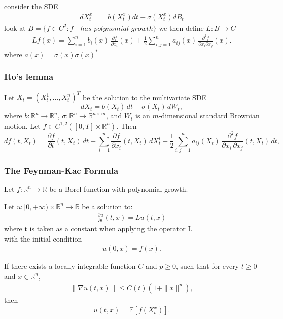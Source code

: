 consider the SDE
\begin{align}
dX_t^x &=b(X_t^x) dt + \sigma(X_t^x)dB_t
\end{align}
look at $B=\{f\in C^2:f\quad has\,\, polynomial\,\, growth\}$ we then define $L:B\rightarrow C$
\begin{align}
L f(x)
=
\sum_{i=1}^n b_i(x)\,\frac{\partial f}{\partial x_i}(x)
+
\frac{1}{2}
\sum_{i,j=1}^n a_{ij}(x)\,\frac{\partial^2 f}{\partial x_i \partial x_j}(x).
\end{align}
where $a(x)=\sigma(x)\sigma(x)^*$

\subsubsection{Ito's lemma}

\begin{theorem}
Let $X_t = (X_t^1,\ldots,X_t^n)^T$ be the solution to the multivariate SDE
\begin{equation}
dX_t = b(X_t)\,dt + \sigma(X_t)\,dW_t,
\end{equation}
where $b:\mathbb{R}^n\to\mathbb{R}^n$, $\sigma:\mathbb{R}^n\to\mathbb{R}^{n\times m}$,
and $W_t$ is an $m$-dimensional standard Brownian motion.
Let $f\in C^{1,2}([0,T]\times\mathbb{R}^n)$. Then
\begin{equation}
df(t,X_t)
=\frac{\partial f}{\partial t}(t,X_t)\,dt
+\sum_{i=1}^{n}\frac{\partial f}{\partial x_i}(t,X_t)\,dX_t^i
+\frac{1}{2}\sum_{i,j=1}^{n}a_{ij}(X_t)\,\frac{\partial^2 f}{\partial x_i\,\partial x_j}(t,X_t)\,dt,
\end{equation}


\end{theorem}
\subsubsection{The Feynman-Kac Formula}

\begin{theorem}
Let \( f : \mathbb{R}^n \to \mathbb{R} \) be a Borel function with polynomial growth.

Let \( u : [0, +\infty) \times \mathbb{R}^n \to \mathbb{R} \) be a solution to:
\begin{align}
\frac{\partial u}{\partial t}(t, x) = Lu(t, x)
\end{align}
where t is taken as a constant when applying the operator L\\
with the initial condition
\begin{align}
u(0, x) = f(x).
\end{align}

If there exists a locally integrable function \( C \) and \( p \geq 0 \), such that for every \( t \geq 0 \) and \( x \in \mathbb{R}^n \),
\begin{align}
\|\nabla u(t, x)\| \leq C(t)\left(1 + \|x\|^p\right),
\end{align}
then
\begin{align}
u(t, x) = \mathbb{E}[f(X_t^x)].
\end{align}
\end{theorem}


